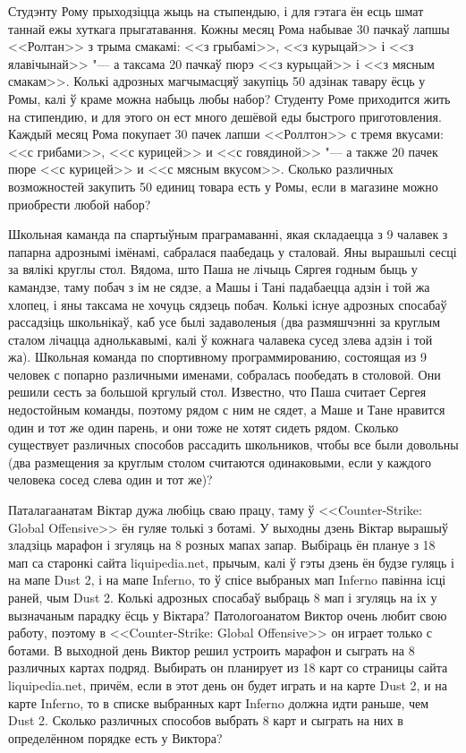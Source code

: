 \documentclass[11pt]{article}
\begin{document}
\begin{problemList}
\bigskip

\problemItemSimple
{Студэнту Рому прыходзіцца жыць на стыпендыю, і для гэтага ён есць шмат таннай ежы хуткага прыгатавання.
Кожны месяц Рома набывае 30 пачкаў лапшы <<Ролтан>> з трыма смакамі:
<<з грыбамі>>, <<з курыцай>> і <<з ялавічынай>> "--- а таксама 20 пачкаў пюрэ <<з курыцай>> і <<з мясным смакам>>.
Колькі адрозных магчымасцяў закупіць 50 адзінак тавару ёсць у Ромы, калі ў краме можна набыць любы набор?}
{Студенту Роме приходится жить на стипендию, и для этого он ест много дешёвой еды быстрого приготовления.
Каждый месяц Рома покупает 30 пачек лапши <<Роллтон>> с тремя вкусами:
<<с грибами>>, <<с курицей>> и <<с говядиной>> "--- а также 20 пачек пюре <<с курицей>> и <<с мясным вкусом>>.
Сколько различных возможностей закупить 50 единиц товара есть у Ромы, если в магазине можно приобрести любой набор?}

\bigskip

\problemItemSimple
{Школьная каманда па спартыўным праграмаванні, якая складаецца з 9 чалавек з папарна адрознымі імёнамі, сабралася паабедаць у сталовай.
Яны вырашылі сесці за вялікі круглы стол. Вядома, што Паша не лічыць Сяргея годным быць у камандзе, 
таму побач з ім не сядзе, а Машы і Тані падабаецца адзін і той жа хлопец, і яны таксама не хочуць сядзець побач.
Колькі існуе адрозных спосабаў рассадзіць школьнікаў, каб усе былі задаволеныя
(два размяшчэнні за круглым сталом лічацца аднолькавымі,
калі ў кожнага чалавека сусед злева адзін і той жа).}
{Школьная команда по спортивному программированию, состоящая из 9 человек с попарно различными именами, собралась пообедать в столовой.
Они решили сесть за большой кргулый стол. Известно, что Паша считает Сергея недостойным команды, поэтому рядом с ним не сядет,
а Маше и Тане нравится один и тот же один парень, и они тоже не хотят сидеть рядом.
Сколько существует различных способов рассадить школьников, чтобы все были довольны
(два размещения за круглым столом считаются одинаковыми, если у каждого человека сосед слева один и тот же)?}

\bigskip

\problemItemSimple
{Паталагаанатам Віктар дужа любіць сваю працу, таму ў <<Counter-Strike: Global Offensive>> ён гуляе толькі з ботамі.
У выходны дзень Віктар вырашыў зладзіць марафон і згуляць на 8 розных мапах запар.
Выбіраць ён плануе з 18 мап са старонкі сайта liquipedia.net, прычым, калі ў гэты дзень ён будзе гуляць і на мапе Dust 2, і на мапе Inferno,
то ў спісе выбраных мап Inferno павінна ісці раней, чым Dust 2.
Колькі адрозных спосабаў выбраць 8 мап і згуляць на іх у вызначаным парадку ёсць у Віктара?}
{Патологоанатом Виктор очень любит свою работу, поэтому в <<Counter-Strike: Global Offensive>> он играет только с ботами.
В выходной день Виктор решил устроить марафон и сыграть на 8 различных картах подряд.
Выбирать он планирует из 18 карт со страницы сайта liquipedia.net, причём, если в этот день он будет играть и на карте Dust 2, и на карте Inferno,
то в списке выбранных карт Inferno должна идти раньше, чем Dust 2.
Сколько различных способов выбрать 8 карт и сыграть на них в определённом порядке есть у Виктора?}

\end{problemList}
\end{document}
